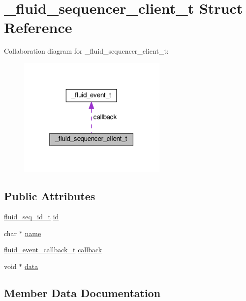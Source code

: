 \hypertarget{struct__fluid__sequencer__client__t}{}\section{\+\_\+fluid\+\_\+sequencer\+\_\+client\+\_\+t Struct Reference}
\label{struct__fluid__sequencer__client__t}


Collaboration diagram for \+\_\+fluid\+\_\+sequencer\+\_\+client\+\_\+t\+:
\nopagebreak
\begin{figure}[H]
\begin{center}
\leavevmode
\includegraphics[width=207pt]{struct__fluid__sequencer__client__t__coll__graph}
\end{center}
\end{figure}
\subsection*{Public Attributes}
\begin{DoxyCompactItemize}
\item 
\hyperlink{types_8h_a69f729a00307f2b8ec1be0dba2203c12}{fluid\+\_\+seq\+\_\+id\+\_\+t} \hyperlink{struct__fluid__sequencer__client__t_a057566dc26e3979fab98d74c7d0939a1}{id}
\item 
char $\ast$ \hyperlink{struct__fluid__sequencer__client__t_aed808370169fbbe8592f8b950b5a568c}{name}
\item 
\hyperlink{seq_8h_ae6bb99d73ba67f0b7e15883b78bfae85}{fluid\+\_\+event\+\_\+callback\+\_\+t} \hyperlink{struct__fluid__sequencer__client__t_ab5e110362b5c59c139dee953ce278ca3}{callback}
\item 
void $\ast$ \hyperlink{struct__fluid__sequencer__client__t_a2c69a1ecf3c2261f8969e7171787b958}{data}
\end{DoxyCompactItemize}


\subsection{Member Data Documentation}
\mbox{\label{struct__fluid__sequencer__client__t_ab5e110362b5c59c139dee953ce278ca3}} 
